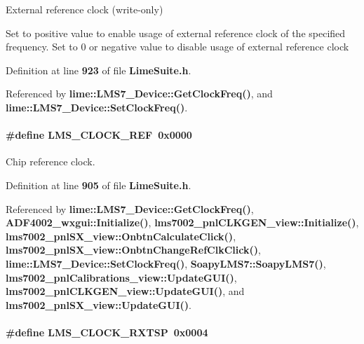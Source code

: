 External reference clock (write-\/only) 

Set to positive value to enable usage of external reference clock of the specified frequency. Set to 0 or negative value to disable usage of external reference clock 

Definition at line {\bf 923} of file {\bf Lime\+Suite.\+h}.



Referenced by {\bf lime\+::\+L\+M\+S7\+\_\+\+Device\+::\+Get\+Clock\+Freq()}, and {\bf lime\+::\+L\+M\+S7\+\_\+\+Device\+::\+Set\+Clock\+Freq()}.

\paragraph[{L\+M\+S\+\_\+\+C\+L\+O\+C\+K\+\_\+\+R\+EF}]{\setlength{\rightskip}{0pt plus 5cm}\#define L\+M\+S\+\_\+\+C\+L\+O\+C\+K\+\_\+\+R\+EF~0x0000}\label{group__LMS__CLOCK__ID_gac8b3ef2e4025803fbf22dba4144d77b2}


Chip reference clock. 



Definition at line {\bf 905} of file {\bf Lime\+Suite.\+h}.



Referenced by {\bf lime\+::\+L\+M\+S7\+\_\+\+Device\+::\+Get\+Clock\+Freq()}, {\bf A\+D\+F4002\+\_\+wxgui\+::\+Initialize()}, {\bf lms7002\+\_\+pnl\+C\+L\+K\+G\+E\+N\+\_\+view\+::\+Initialize()}, {\bf lms7002\+\_\+pnl\+S\+X\+\_\+view\+::\+Onbtn\+Calculate\+Click()}, {\bf lms7002\+\_\+pnl\+S\+X\+\_\+view\+::\+Onbtn\+Change\+Ref\+Clk\+Click()}, {\bf lime\+::\+L\+M\+S7\+\_\+\+Device\+::\+Set\+Clock\+Freq()}, {\bf Soapy\+L\+M\+S7\+::\+Soapy\+L\+M\+S7()}, {\bf lms7002\+\_\+pnl\+Calibrations\+\_\+view\+::\+Update\+G\+U\+I()}, {\bf lms7002\+\_\+pnl\+C\+L\+K\+G\+E\+N\+\_\+view\+::\+Update\+G\+U\+I()}, and {\bf lms7002\+\_\+pnl\+S\+X\+\_\+view\+::\+Update\+G\+U\+I()}.

\paragraph[{L\+M\+S\+\_\+\+C\+L\+O\+C\+K\+\_\+\+R\+X\+T\+SP}]{\setlength{\rightskip}{0pt plus 5cm}\#define L\+M\+S\+\_\+\+C\+L\+O\+C\+K\+\_\+\+R\+X\+T\+SP~0x0004}\label{group__LMS__CLOCK__ID_gae3b0ed66bdc27949dfe0c4a860da7d01}


